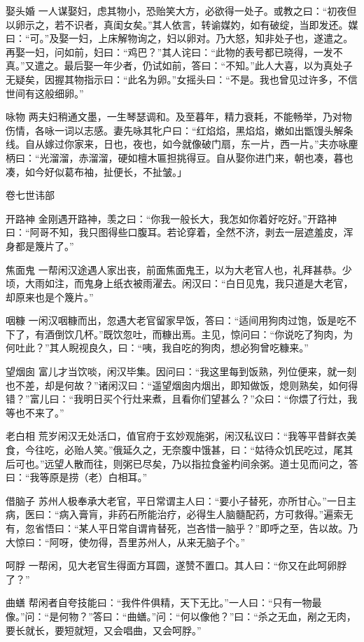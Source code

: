 \documentclass[12pt,UTF8]{ctexbook}
\begin{document}
娶头婚
一人谋娶妇，虑其物小，恐贻笑大方，必欲得一处子。或教之曰：“初夜但以卵示之，若不识者，真闺女矣。”其人依言，转谕媒妁，如有破绽，当即发还。媒曰：“可。”及娶一妇，上床解物询之，妇以卵对。乃大怒，知非处子也，遂遣之。再娶一妇，问如前，妇曰：“鸡巴？”其人诧曰：“此物的表号都已晓得，一发不真。”又遣之。最后娶一年少者，仍试如前，答曰：“不知。”此人大喜，以为真处子无疑矣，因握其物指示曰：“此名为卵。”女摇头曰：“不是。我也曾见过许多，不信世间有这般细卵。”

咏物
两夫妇稍通文墨，一生琴瑟调和。及至暮年，精力衰耗，不能畅举，乃对物伤情，各咏一词以志感。妻先咏其牝户曰：“红焰焰，黑焰焰，嫩如出甑馒头解条线。自从嫁过你家来，日也，夜也，如今就像破门扇，东一片，西一片。”夫亦咏麈柄曰：“光溜溜，赤溜溜，硬如檀木匾担挑得豆。自从娶你进门来，朝也凑，暮也凑，如今好似葛布袖，扯便长，不扯皱。」

卷七世讳部

开路神
金刚遇开路神，羡之曰：“你我一般长大，我怎如你着好吃好。”开路神曰：“阿哥不知，我只图得些口腹耳。若论穿着，全然不济，剥去一层遮羞皮，浑身都是篾片了。”

焦面鬼
一帮闲汉途遇人家出丧，前面焦面鬼王，以为大老官人也，礼拜甚恭。少顷，大雨如注，而鬼身上纸衣被雨濯去。闲汉曰：“白日见鬼，我只道是大老官，却原来也是个篾片。”

咽糠
一闲汉咽糠而出，忽遇大老官留家早饭，答曰：“适间用狗肉过饱，饭是吃不下了，有酒倒饮几杯。”既饮忽吐，而糠出焉。主见，惊问曰：“你说吃了狗肉，为何吐此？”其人睨视良久，曰：“咦，我自吃的狗肉，想必狗曾吃糠来。”

望烟囱
富儿才当饮啖，闲汉毕集。因问曰：“我这里每到饭熟，列位便来，就一刻也不差，却是何故？”诸闲汉曰：“遥望烟囱内烟出，即知做饭，熄则熟矣，如何得错？”富儿曰：“我明日买个行灶来煮，且看你们望甚么？”众曰：“你煨了行灶，我等也不来了。”

老白相
荒岁闲汉无处活口，值官府于玄妙观施粥，闲汉私议曰：“我等平昔鲜衣美食，今往吃，必贻人笑。”俄延久之，无奈腹中饿甚，曰：“姑待众饥民吃过，尾其后可也。”远望人散而往，则粥已尽矣，乃以指拉食釜杓间余粥。道士见而问之，答曰：“我等原是捞（老）白相耳。”

借脑子
苏州人极奉承大老官，平日常谓主人曰：“要小子替死，亦所甘心。”一日主病，医曰：“病入膏肓，非药石所能治疗，必得生人脑髓配药，方可救得。”遍索无有，忽省悟曰：“某人平日常自谓肯替死，岂吝惜一脑乎？”即呼之至，告以故。乃大惊曰：“阿呀，使勿得，吾里苏州人，从来无脑子个。”

呵脬
一帮闲，见大老官生得面方耳圆，遂赞不置口。其人曰：“你又在此呵卵脬了？”

曲蟮
帮闲者自夸技能曰：“我件件俱精，天下无比。”一人曰：“只有一物最像。”问：“是何物？”答曰：“曲蟮。”问：“何以像他？”曰：“杀之无血，剐之无肉，要长就长，要短就短，又会唱曲，又会呵脬。”
\end{document}
